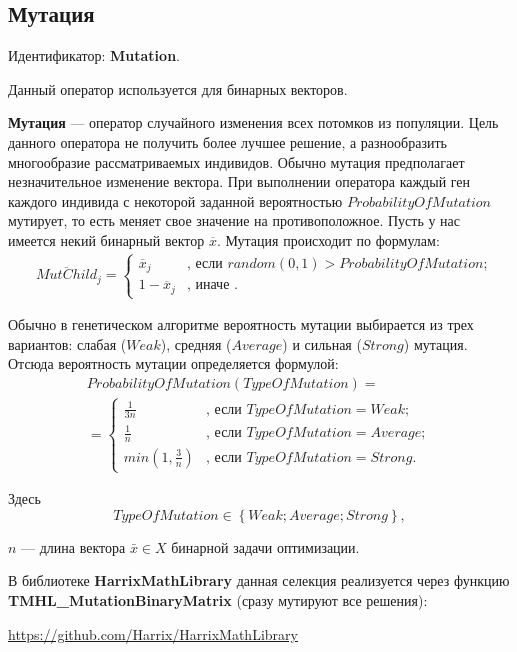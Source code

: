\subsection{Мутация} \label{SetOfOperatorsAlgorithms:Mutation}

Идентификатор: \textbf{Mutation}.

Данный оператор используется для бинарных векторов.

\textbf{Мутация} --- оператор случайного изменения всех потомков из популяции. Цель данного оператора  не получить более лучшее решение, а разнообразить многообразие рассматриваемых индивидов. Обычно мутация предполагает незначительное изменение вектора. При выполнении оператора каждый ген каждого индивида с некоторой заданной вероятностью  $ ProbabilityOfMutation $ мутирует, то есть меняет свое значение на противоположное. Пусть у нас имеется некий бинарный вектор $ \overline{x} $.  Мутация происходит по формулам:
\begin{align}
\label{SetOfOperatorsAlgorithms:eq:Mutation}
&\overline{MutChild}_j=\left\lbrace \begin{aligned}
\overline{x}_j&\text{, если } random \left(0, 1 \right)>ProbabilityOfMutation; \\
1-\overline{x}_j&\text{, иначе }.
\end{aligned}\right.
\end{align}

Обычно в генетическом алгоритме вероятность мутации выбирается из трех вариантов: слабая ($ Weak $), средняя ($ Average $) и сильная ($ Strong $) мутация.
Отсюда вероятность мутации определяется формулой:
\begin{align}
\label{SetOfOperatorsAlgorithms:eq:ProbabilityOfMutation}
ProbabilityOfMutation\left( TypeOfMutation\right) =\\ =\left\lbrace \begin{aligned}
\frac{1}{3n}&\text{, если }TypeOfMutation=Weak; \\ \frac{1}{n}&\text{, если }TypeOfMutation=Average; \\ min\left(1, \frac{3}{n}\right) &\text{, если }TypeOfMutation=Strong.
\end{aligned}\right.\nonumber
\end{align}

Здесь
\begin{equation}
\label{SetOfOperatorsAlgorithms:eq:TypeOfMutation}
TypeOfMutation \in \left\lbrace Weak; Average;Strong\right\rbrace ,
\end{equation}

$ n $ --- длина вектора $ \bar{x}\in X $ бинарной задачи оптимизации.

В библиотеке \textbf{HarrixMathLibrary} данная селекция реализуется через функцию \textbf{TMHL\_MutationBinaryMatrix} (сразу мутируют все решения):

\href{https://github.com/Harrix/HarrixMathLibrary}{https://github.com/Harrix/HarrixMathLibrary}